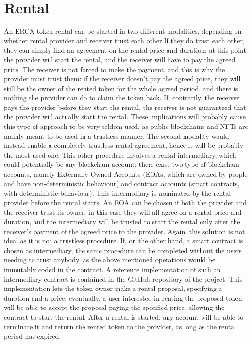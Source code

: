 \documentclass[english, LaM, oneside]{sapthesis}%
\begin{document}
\section{Rental}
An ERCX token rental can be started in two different modalities, depending on whether rental provider and receiver trust each other.\newline If they do trust each other, they can simply find an agreement on the rental price and duration; at this point the provider will start the rental, and the receiver will have to pay the agreed price. The receiver is not forced to make the payment, and this is why the provider must trust them: if the receiver doesn't pay the agreed price, they will still be the owner of the rented token for the whole agreed period, and there is nothing the provider can do to claim the token back. If, contrarily, the receiver pays the provider before they start the rental, the receiver is not guaranteed that the provider will actually start the rental. These implications will probably cause this type of approach to be very seldom used, as public blockchains and NFTs are mainly meant to be used in a trustless manner.\newline
The second modality would instead enable a completely trustless rental agreement, hence it will be probably the most used one. This other procedure involves a rental intermediary, which could potentially be any blockchain account: there exist two type of blockchain accounts, namely Externally Owned Accounts (EOAs, which are owned by people and have non-deterministic behaviour) and contract accounts (smart contracts, with deterministic behaviour). This intermediary is nominated by the rental provider before the rental starts. An EOA can be chosen if both the provider and the receiver trust its owner: in this case they will all agree on a rental price and duration, and the intermediary will be trusted to start the rental only after the receiver's payment of the agreed price to the provider. Again, this solution is not ideal as it is not a trustless procedure. If, on the other hand, a smart contract is chosen as intermediary, the same procedure can be completed without the users needing to trust anybody, as the above mentioned operations would be immutably coded in the contract. A reference implementation of such an intermediary contract is contained in the GitHub repository of the project. This implementation lets the token owner make a rental proposal, specifying a duration and a price; eventually, a user interested in renting the proposed token will be able to accept the proposal paying the specified price, allowing the contract to start the rental. After a rental is started, any account will be able to terminate it and return the rented token to the provider, as long as the rental period has expired. \newline
\end{document}
